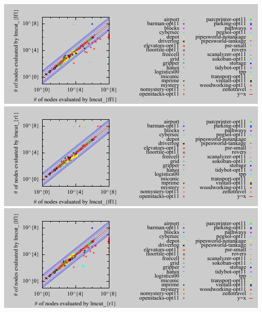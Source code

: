 \includegraphics{tables/aaai16-5min/aaai16-evaluated-lmcut_ff-lmcut_lf.pdf}
\includegraphics{tables/aaai16-5min/aaai16-evaluated-lmcut_ff-lmcut_r.pdf}
\includegraphics{tables/aaai16-5min/aaai16-evaluated-lmcut_r-lmcut_lf.pdf}
